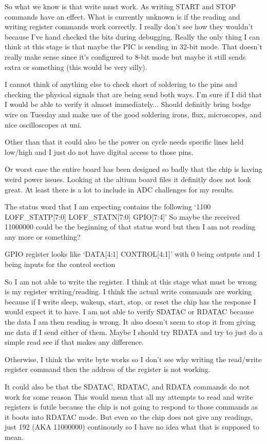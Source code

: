 So what we know is that write must work. As writing START and STOP commands have
an effect.
What is currently unknown is if the reading and writing register commands work correctly.
I really don't see how they wouldn't because I've hand checked the bits during debugging.
Really the only thing I can think at this stage is that maybe the PIC is sending in 32-bit
mode. That doesn't really make sense since it's configured to 8-bit mode but maybe it
still sends extra or something (this would be very silly).

I cannot think of anything else to check short of soldering to the pins and checking
the physical signals that are being send both ways. I'm sure if I did that I would be able
to verify it almost immediately... Should definitly bring bodge wire on Tuesday and make
use of the good soldering irons, flux, microscopes, and nice oscilloscopes at uni.

Other than that it could also be the power on cycle needs specific lines held low/high
and I just do not have digital access to those pins.

Or worst case the entire board has been designed so badly that the chip is having weird
power issues. Looking at the altium board files it definitly does not look great.
At least there is a lot to include in ADC challenges for my results.


The status word that I am expecting contains the following
`1100 LOFF\_STATP[7:0] LOFF\_STATN[7:0] GPIO[7:4]'
So maybe the received 11000000 could be the beginning of that status word but then I
am not reading any more or something?

GPIO register looks like `DATA[4:1] CONTROL[4:1]' with 0 being outputs and 1 being inputs
for the control section

So I am not able to write the register. I think at this stage what must be wrong is my
register writing/reading.
I think the actual write commands are working
because if I write sleep, wakeup, start, stop, or reset
the chip has the response I would expect it to have.
I am not able to verify SDATAC or RDATAC because the data I am then reading is wrong.
It also doesn't seem to stop it from giving me data if I send either of them.
Maybe I should try RDATA and try to just do a simple read see if that makes any difference.

Otherwise, I think the write byte works so I don't see why writing the read/write register
command then the address of the register is not working.

It could also be that the SDATAC, RDATAC, and RDATA commands do not work for some reason
This would mean that all my attempts to read and write registers is futile because
the chip is not going to respond to those commands as it boots into RDATAC mode.
But even so the chip does not give any readings, just 192 (AKA 11000000) continously
so I have no idea what that is supposed to mean.


